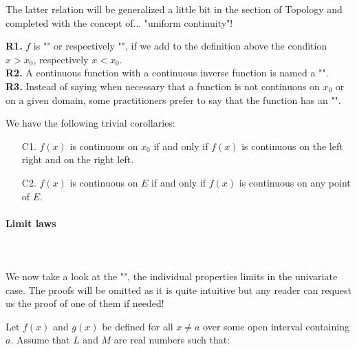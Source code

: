 	The latter relation will be generalized a little bit in the section of Topology and completed with the concept of... "uniform continuity"!
	\begin{tcolorbox}[title=Remarks,colframe=black,arc=10pt]
	\textbf{R1. }$f$ is "" or respectively "", if we add to the definition above the condition $x>x_0$, respectively $x<x_0$.\\
	
	\textbf{R2.} A continuous function with a continuous inverse function is named a "".\\
	
	\textbf{R3.} Instead of saying when necessary that a function is not continuous on $x_0$ or on a given domain, some practitioners prefer to say that the function has an "".
	\end{tcolorbox}	
	We have the following trivial corollaries:
	\begin{enumerate}
		\item[C1.] $f(x)$ is continuous on $x_0$ if and only if $f(x)$ is continuous on the left right and on the right left.
		
		\item[C2.] $f(x)$ is continuous on $E$ if and only if $f(x)$ is continuous on any point of $E$.
	\end{enumerate}
	
	\paragraph{Limit laws}\mbox{}\\\\
	We now take a look at the "", the individual properties limits in the univariate case. The proofs will be omitted as it is quite intuitive but any reader can request us the proof of one of them if needed!
	
	Let $f(x)$ and $g(x)$ be defined for all $x\neq a$ over some open interval containing $a$. Assume that $L$ and $M$ are real numbers such that:
	
